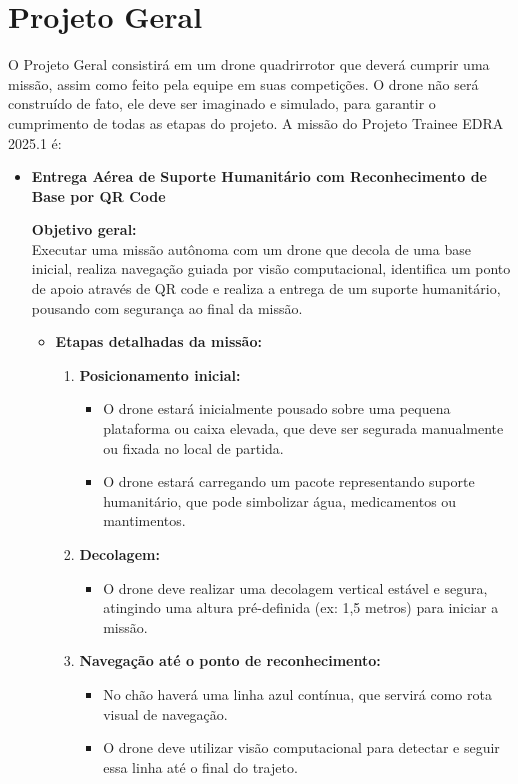 \section{Projeto Geral}

O Projeto Geral consistirá em um drone quadrirrotor que deverá cumprir uma missão, assim como feito pela equipe em suas competições. O drone não será construído de fato, ele deve ser imaginado e simulado, para garantir o cumprimento de todas as etapas do projeto. A missão do Projeto Trainee EDRA 2025.1 é:

\begin{itemize}
    \item \textbf{Entrega Aérea de Suporte Humanitário com Reconhecimento de Base por QR Code}
    
    \textbf{Objetivo geral:} \\
    Executar uma missão autônoma com um drone que decola de uma base inicial, realiza navegação guiada por visão computacional, identifica um ponto de apoio através de QR code e realiza a entrega de um suporte humanitário, pousando com segurança ao final da missão.
    
    \begin{itemize}
        \item \textbf{Etapas detalhadas da missão:}
        
        \begin{enumerate}
            \item \textbf{Posicionamento inicial:}
            \begin{itemize}
                \item O drone estará inicialmente pousado sobre uma pequena plataforma ou caixa elevada, que deve ser segurada manualmente ou fixada no local de partida.
                \item O drone estará carregando um pacote representando suporte humanitário, que pode simbolizar água, medicamentos ou mantimentos.
            \end{itemize}
            
            \item \textbf{Decolagem:}
            \begin{itemize}
                \item O drone deve realizar uma decolagem vertical estável e segura, atingindo uma altura pré-definida (ex: 1,5 metros) para iniciar a missão.
            \end{itemize}
            
            \item \textbf{Navegação até o ponto de reconhecimento:}
            \begin{itemize}
                \item No chão haverá uma linha azul contínua, que servirá como rota visual de navegação.
                \item O drone deve utilizar visão computacional para detectar e seguir essa linha até o final do trajeto.
            \end{itemize}
            

\end{enumerate}
\end{itemize}
\end{itemize}
